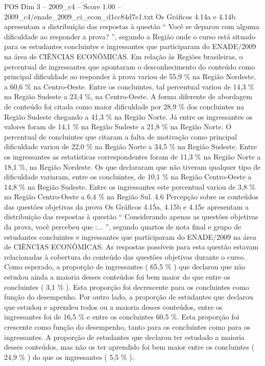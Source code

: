 \begin{textsample}{POS Dim 3 – 2009\_c4 – Score 1.00 – 2009\_c4/enade\_2009\_ci\_econ\_d1cc84d7e1.txt}
Os Gráficos 4.14a e 4.14b apresentam a distribuição das respostas à questão “ Você se deparou com alguma dificuldade ao responder a prova? ”, segundo a Região onde o curso está situado para os estudantes concluintes e ingressantes que participaram do ENADE/2009 na área de CIÊNCIAS ECONÔMICAS.
Em relação às Regiões brasileiras, o percentual de ingressantes que apontaram o desconhecimento do conteúdo como principal dificuldade ao responder à prova variou de 55,9 \% na Região Nordeste, a 60,6 \% na Centro-Oeste.
Entre os concluintes, tal percentual variou de 14,3 \% na Região Sudeste a 23,4 \%, na Centro-Oeste.
A forma diferente de abordagem de conteúdo foi citada como maior dificuldade por 28,9 \% dos concluintes na Região Sudeste chegando a 41,3 \% na Região Norte.
Já entre os ingressantes os valores foram de 14,1 \% na Região Sudeste a 21,8 \% na Região Norte.
O percentual de concluintes que citaram a falta de motivação como principal dificuldade variou de 22,0 \% na Região Norte a 34,5 \% na Região Sudeste.
Entre os ingressantes as estatísticas correspondentes foram de 11,3 \% na Região Norte a 18,1 \%, na Região Nordeste.
Os que declararam que não tiveram qualquer tipo de dificuldade variaram, entre os concluintes, de 10,1 \% na Região Centro-Oeste a 14,8 \% na Região Sudeste.
Entre os ingressantes este percentual variou de 3,8 \% na Região Centro-Oeste a 6,4 \% na Região Sul. 4.6 Percepção sobre os conteúdos das questões objetivas da prova Os Gráficos 4.15a, 4.15b e 4.15c apresentam a distribuição das respostas à questão “ Considerando apenas as questões objetivas da prova, você percebeu que :... ”, segundo quartos de nota final e grupo de estudantes concluintes e ingressantes que participaram do ENADE/2009 na área de CIÊNCIAS ECONÔMICAS.
As respostas possíveis para esta questão estavam relacionadas à cobertura do conteúdo das questões objetivas durante o curso.
Como esperado, a proporção de ingressantes ( 65,5 \% ) que declarou que não estudou ainda a maioria desses conteúdos foi bem maior do que entre os concluintes ( 3,1 \% ).
Esta proporção foi decrescente para os concluintes como função do desempenho.
Por outro lado, a proporção de estudantes que declarou que estudou e aprendeu todos ou a maioria desses conteúdos, entre os ingressantes foi de 16,5 \% e entre os concluintes 60,5 \%.
Esta proporção foi crescente como função do desempenho, tanto para os concluintes como para os ingressantes.
A proporção de estudantes que declarou ter estudado a maioria desses conteúdos, mas não os ter aprendido foi bem maior entre os concluintes ( 24,9 \% ) do que os ingressantes ( 5,5 \% ).

\end{textsample}

